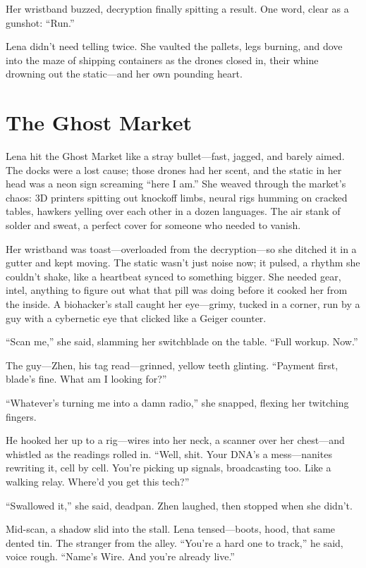 \documentclass[12pt]{book}
\begin{document}
Her wristband buzzed, decryption finally spitting a result. One word, clear as a gunshot: ``Run.''

Lena didn’t need telling twice. She vaulted the pallets, legs burning, and dove into the maze of shipping containers as the drones closed in, their whine drowning out the static---and her own pounding heart.

\chapter{The Ghost Market}

Lena hit the Ghost Market like a stray bullet---fast, jagged, and barely aimed. The docks were a lost cause; those drones had her scent, and the static in her head was a neon sign screaming ``here I am.'' She weaved through the market’s chaos: 3D printers spitting out knockoff limbs, neural rigs humming on cracked tables, hawkers yelling over each other in a dozen languages. The air stank of solder and sweat, a perfect cover for someone who needed to vanish.

Her wristband was toast---overloaded from the decryption---so she ditched it in a gutter and kept moving. The static wasn’t just noise now; it pulsed, a rhythm she couldn’t shake, like a heartbeat synced to something bigger. She needed gear, intel, anything to figure out what that pill was doing before it cooked her from the inside. A biohacker’s stall caught her eye---grimy, tucked in a corner, run by a guy with a cybernetic eye that clicked like a Geiger counter.

``Scan me,'' she said, slamming her switchblade on the table. ``Full workup. Now.''

The guy---Zhen, his tag read---grinned, yellow teeth glinting. ``Payment first, blade’s fine. What am I looking for?''

``Whatever’s turning me into a damn radio,'' she snapped, flexing her twitching fingers.

He hooked her up to a rig---wires into her neck, a scanner over her chest---and whistled as the readings rolled in. ``Well, shit. Your DNA’s a mess---nanites rewriting it, cell by cell. You’re picking up signals, broadcasting too. Like a walking relay. Where’d you get this tech?''

``Swallowed it,'' she said, deadpan. Zhen laughed, then stopped when she didn’t.

Mid-scan, a shadow slid into the stall. Lena tensed---boots, hood, that same dented tin. The stranger from the alley. ``You’re a hard one to track,'' he said, voice rough. ``Name’s Wire. And you’re already live.''
\end{document}
